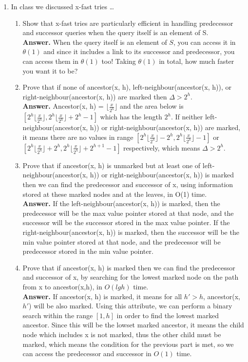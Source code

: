 \documentclass[letterpaper,12pt]{article}
\begin{document}
\begin{enumerate}
\item In class we discussed x-fast tries \ldots
	\begin{enumerate}
		\item Show that x-fast tries are particularly efficient in handling predecessor and successor queries when the query itself is an element of S.\\
		\textbf{Answer.} When the query itself is an element of $S$, you can access it in $\theta(1)$ and since it includes a link to its successor and predecessor, you can access them in $\theta(1)$ too! Taking $\theta(1)$ in total, how much faster you want it to be?

		\item Prove that if none of ancestor(x, h), left-neighbour(ancestor(x, h)), or right-neighbour(ancestor(x, h)) are marked then $\Delta > 2^h$.\\
		\textbf{Answer.} Ancestor(x, h) = $\lfloor \frac{x}{2^h} \rfloor$ and the area below is $[2^h \lfloor \frac{x}{2^h} \rfloor, 2^h \lfloor \frac{x}{2^h} \rfloor + 2^h-1]$ which has the length $2^h$. If neither left-neighbour(ancestor(x, h)) or right-neighbour(ancestor(x, h)) are marked, it means there are no values in range $[2^h \lfloor \frac{x}{2^h} \rfloor - 2^h, 2^h \lfloor \frac{x}{2^h} \rfloor -1]$ or $[2^h \lfloor \frac{x}{2^h} \rfloor + 2^h, 2^h \lfloor \frac{x}{2^h} \rfloor + 2^{h+1}-1]$ respectively, which means $\Delta > 2^h$.

		\item Prove that if ancestor(x, h) is unmarked but at least one of left-neighbour(ancestor(x, h)) or right-neighbour(ancestor(x, h)) is marked then we can find the predecessor and successor of x, using information stored at these marked nodes and at the leaves, in O(1) time.\\
		\textbf{Answer.} If the left-neighbour(ancestor(x, h)) is marked, then the predecessor will be the max value pointer stored at that node, and the successor will be the successor stored in the max value pointer. If the right-neighbour(ancestor(x, h)) is marked, then the successor will be the min value pointer stored at that node, and the predecessor will be predecessor stored in the min value pointer.

		\item Prove that if ancestor(x, h) is marked then we can find the predecessor and successor of x, by searching for the lowest marked node on the path from x to ancestor(x,h), in $O(lg h)$ time.\\
		\textbf{Answer.} If ancestor(x, h) is marked, it means for all $h'>h$, ancestor(x, $h'$) will be also marked. Using this attribute, we can perform a binary search within the range $[1, h]$ in order to find the lowest marked ancestor. Since this will be the lowset marked ancestor, it means the child node which includes x is not marked, thus the other child must be marked, which means the condition for the previous part is met, so we can access the predecessor and successor in $O(1)$ time.


\end{enumerate}
\end{enumerate}
\end{document}
